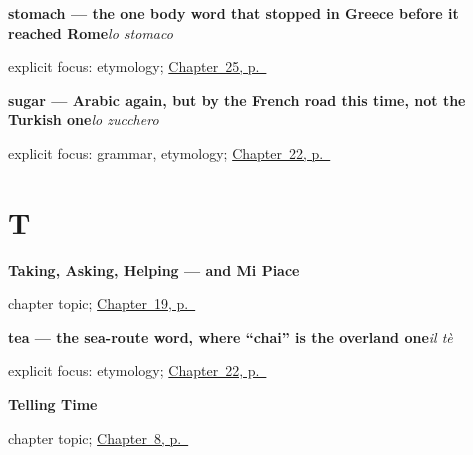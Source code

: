 \noindent\begin{minipage}[t]{\linewidth}
\raggedright
\textbf{stomach — the one body word that stopped in Greece before it reached Rome}\enspace\emph{lo stomaco}\par
\footnotesize explicit focus: etymology; \hyperref[ch:it-nose-stomach-throat]{Chapter~25, p.~\pageref*{ch:it-nose-stomach-throat}}
\end{minipage}\par\smallskip

\noindent\begin{minipage}[t]{\linewidth}
\raggedright
\textbf{sugar — Arabic again, but by the French road this time, not the Turkish one}\enspace\emph{lo zucchero}\par
\footnotesize explicit focus: grammar, etymology; \hyperref[ch:it-coffee-tea-milk-sugar]{Chapter~22, p.~\pageref*{ch:it-coffee-tea-milk-sugar}}
\end{minipage}\par\smallskip

\section*{T}

\noindent\begin{minipage}[t]{\linewidth}
\raggedright
\textbf{Taking, Asking, Helping — and Mi Piace}\par
\footnotesize chapter topic; \hyperref[ch:it-backwards-verb]{Chapter~19, p.~\pageref*{ch:it-backwards-verb}}
\end{minipage}\par\smallskip

\noindent\begin{minipage}[t]{\linewidth}
\raggedright
\textbf{tea — the sea-route word, where \textquotedblleft{}chai\textquotedblright{} is the overland one}\enspace\emph{il tè}\par
\footnotesize explicit focus: etymology; \hyperref[ch:it-coffee-tea-milk-sugar]{Chapter~22, p.~\pageref*{ch:it-coffee-tea-milk-sugar}}
\end{minipage}\par\smallskip

\noindent\begin{minipage}[t]{\linewidth}
\raggedright
\textbf{Telling Time}\par
\footnotesize chapter topic; \hyperref[ch:it-telling-time]{Chapter~8, p.~\pageref*{ch:it-telling-time}}
\end{minipage}\par\smallskip

